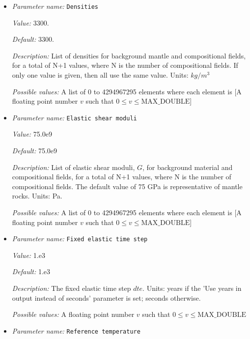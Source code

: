 \begin{itemize}
\item {\it Parameter name:} {\tt Densities}
\label{parameters:Material model/Viscoelastic/Densities}


{\it Value:} 3300.


{\it Default:} 3300.


{\it Description:} List of densities for background mantle and compositional fields, for a total of N+1 values, where N is the number of compositional fields. If only one value is given, then all use the same value.  Units: $kg / m^3$


{\it Possible values:} A list of 0 to 4294967295 elements where each element is [A floating point number $v$ such that $0 \leq v \leq \text{MAX\_DOUBLE}$]
\item {\it Parameter name:} {\tt Elastic shear moduli}
\label{parameters:Material model/Viscoelastic/Elastic shear moduli}


{\it Value:} 75.0e9


{\it Default:} 75.0e9


{\it Description:} List of elastic shear moduli, $G$, for background material and compositional fields, for a total of N+1 values, where N is the number of compositional fields. The default value of 75 GPa is representative of mantle rocks. Units: Pa.


{\it Possible values:} A list of 0 to 4294967295 elements where each element is [A floating point number $v$ such that $0 \leq v \leq \text{MAX\_DOUBLE}$]
\item {\it Parameter name:} {\tt Fixed elastic time step}
\label{parameters:Material model/Viscoelastic/Fixed elastic time step}


{\it Value:} 1.e3


{\it Default:} 1.e3


{\it Description:} The fixed elastic time step $dte$. Units: years if the 'Use years in output instead of seconds' parameter is set; seconds otherwise.


{\it Possible values:} A floating point number $v$ such that $0 \leq v \leq \text{MAX\_DOUBLE}$
\item {\it Parameter name:} {\tt Reference temperature}
\label{parameters:Material model/Viscoelastic/Reference temperature}



\end{itemize}
